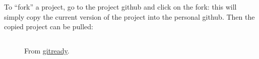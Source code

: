 \begin{lstlisting}[language=bash]
\end{lstlisting}

\begin{lstlisting}[language=bash]
\end{lstlisting}


To ``fork'' a project, go to the project github and click on the fork: this will simply copy the current version of the project
into the personal github. Then the copied project can be pulled:
\begin{lstlisting}[language=bash]
\end{lstlisting}



\begin{figure}[htb]\begin{center}
\caption{From \href{http://gitready.com/beginner/2009/01/21/pushing-and-pulling.html}{gitready}.}
\end{center}\end{figure}


